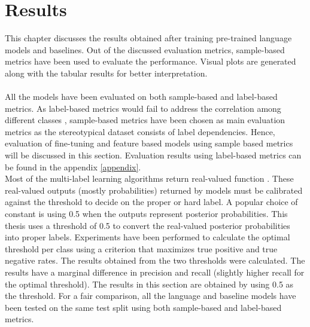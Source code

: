 \chapter{Results}

This chapter discusses the results obtained after training pre-trained language models and baselines. Out of the discussed evaluation metrics, sample-based metrics have been used to evaluate the performance. Visual plots are generated along with the tabular results for better interpretation. 
\\
\\
All the models have been evaluated on both sample-based and label-based metrics. As label-based metrics would fail to address the correlation among different classes \cite{zhang2010multi}, sample-based metrics have been chosen as main  evaluation metrics as the stereotypical dataset consists of label dependencies. Hence, evaluation of fine-tuning and feature based models using sample based metrics will be discussed in this section. Evaluation results using label-based metrics can be found in the appendix \ref{appendix}.
\\

Most of the multi-label learning algorithms return real-valued function \cite{zhang2010multi}. These real-valued outputs (mostly probabilities) returned by models must be calibrated against the threshold to decide on the proper or hard label. A popular choice of constant is using 0.5 when the outputs represent posterior probabilities\cite{zhang2010multi}. This thesis uses a threshold of 0.5 to convert the real-valued posterior probabilities into proper labels. Experiments have been performed to calculate the optimal threshold per class using a criterion that maximizes true positive and true negative rates. The results obtained from the two thresholds were calculated. The results have a marginal difference in precision and recall (slightly higher recall for the optimal threshold). The results in this section are obtained by using 0.5 as the threshold. For a fair comparison, all the language and baseline models have been tested on the same test split using both sample-based and label-based metrics. 

